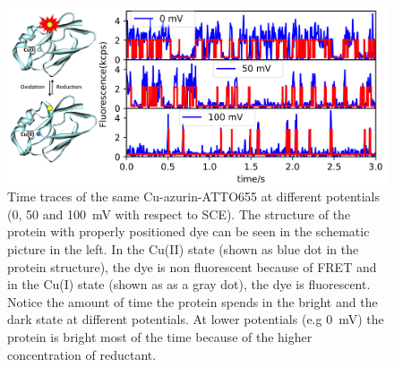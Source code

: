 \documentclass[journal=jacsat,manuscript=article]{achemso}
\begin{document}
\begin{figure}
	\centering
	\includegraphics[width=\textwidth]{Figure_1_timetrace_CuAzu}
	\caption{Time traces of the same Cu-azurin-ATTO655 at different potentials (0, 50 and \SI{100}{\mV} with respect to SCE).
	The structure of the protein with properly positioned dye can be seen in the schematic picture in the left.
	In the Cu(II) state (shown as blue dot in the protein structure), the dye is non fluorescent because of FRET and in the Cu(I) state (shown as as a gray dot), the dye is fluorescent. Notice the amount of time the protein spends in the bright and the dark state at different potentials.
	At lower potentials (e.g \SI{0}{\mV}) the protein is bright most of the time because of the higher concentration of reductant.}
	\label{fig:timetrace}
\end{figure}
\end{document}
